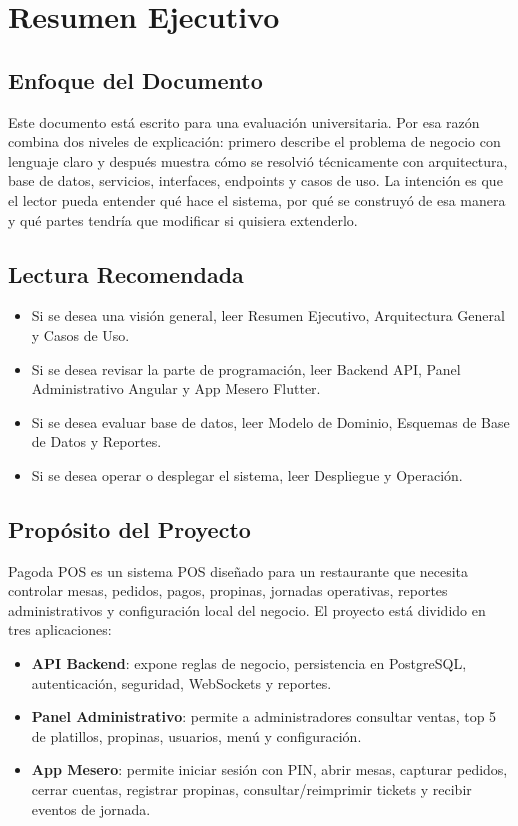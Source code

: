 \documentclass[11pt,letterpaper,openany]{report}
\newcommand{\projectname}{Pagoda POS}
\begin{document}
\tableofcontents
\listoffigures
\listoftables
\clearpage

\chapter{Resumen Ejecutivo}

\section{Enfoque del Documento}

Este documento está escrito para una evaluación universitaria. Por esa razón combina dos niveles de explicación: primero describe el problema de negocio con lenguaje claro y después muestra cómo se resolvió técnicamente con arquitectura, base de datos, servicios, interfaces, endpoints y casos de uso. La intención es que el lector pueda entender qué hace el sistema, por qué se construyó de esa manera y qué partes tendría que modificar si quisiera extenderlo.

\section{Lectura Recomendada}

\begin{itemize}
  \item Si se desea una visión general, leer Resumen Ejecutivo, Arquitectura General y Casos de Uso.
  \item Si se desea revisar la parte de programación, leer Backend API, Panel Administrativo Angular y App Mesero Flutter.
  \item Si se desea evaluar base de datos, leer Modelo de Dominio, Esquemas de Base de Datos y Reportes.
  \item Si se desea operar o desplegar el sistema, leer Despliegue y Operación.
\end{itemize}

\section{Propósito del Proyecto}

\projectname{} es un sistema POS diseñado para un restaurante que necesita controlar mesas, pedidos, pagos, propinas, jornadas operativas, reportes administrativos y configuración local del negocio. El proyecto está dividido en tres aplicaciones:

\begin{itemize}[leftmargin=*]
  \item \textbf{API Backend}: expone reglas de negocio, persistencia en PostgreSQL, autenticación, seguridad, WebSockets y reportes.
  \item \textbf{Panel Administrativo}: permite a administradores consultar ventas, top 5 de platillos, propinas, usuarios, menú y configuración.
  \item \textbf{App Mesero}: permite iniciar sesión con PIN, abrir mesas, capturar pedidos, cerrar cuentas, registrar propinas, consultar/reimprimir tickets y recibir eventos de jornada.
\end{itemize}
\end{document}
